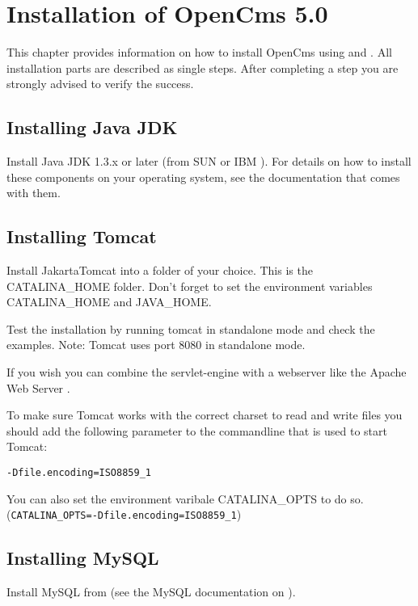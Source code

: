 \chapter{Installation of OpenCms 5.0}

This chapter provides information on how to install OpenCms using
 and
. All installation parts are
described as single steps. After completing a step you are
strongly advised to verify the success.

\section{Installing Java JDK}
Install Java JDK 1.3.x or later (from SUN
or IBM
).
For details on how to install these components on your operating
system, see the documentation that comes with them.

\section{Installing Tomcat}

Install JakartaTomcat
into a folder of your choice. This is the CATALINA\_HOME folder.
Don't forget to set the environment variables CATALINA\_HOME and
JAVA\_HOME.

Test the installation by running tomcat in standalone mode and
check the examples. Note: Tomcat uses port 8080 in standalone
mode.

If you wish you can combine the servlet-engine with a webserver
like the Apache Web Server
.

To make sure Tomcat works with the correct charset to read and
write files you should add the following parameter to the
commandline that is used to start Tomcat:

\texttt{-Dfile.encoding=ISO8859\_1}

You can also set the environment varibale CATALINA\_OPTS to do so.\\
(\texttt{CATALINA\_OPTS=-Dfile.encoding=ISO8859\_1})

\section{Installing MySQL}
Install MySQL from
(see the MySQL documentation on
).

